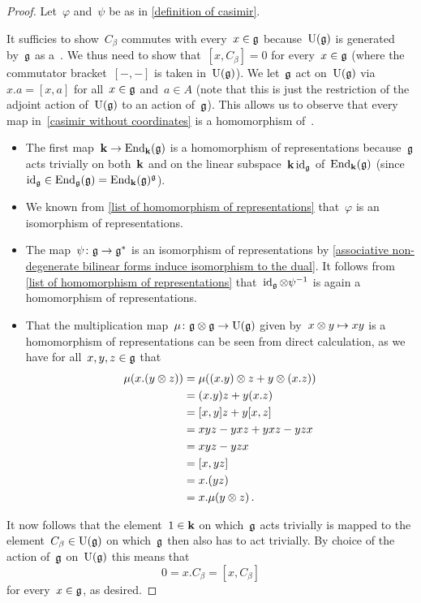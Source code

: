 \begin{proof}
  Let~$\varphi$ and~$\psi$ be as in \cref{definition of casimir}.
  
  It sufficies to show~$C_\beta$ commutes with every~$x \in \mathfrak{g}$ because~$\operatorname{U}(\mathfrak{g})$ is generated by~$\glie$ as a~\algebra{$\kf$}.
  We thus need to show that~$[x, C_\beta] = 0$ for every~$x \in \mathfrak{g}$ (where the commutator bracket~$[-,-]$ is taken in~$\operatorname{U}(\mathfrak{g})$).
  We let~$\glie$ act on~$\operatorname{U}(\mathfrak{g})$ via~$x.a = [x,a]$ for all~$x \in \mathfrak{g}$ and~$a \in A$ (note that this is just the restriction of the adjoint action of~$\operatorname{U}(\mathfrak{g})$ to an action of~$\glie$).
  This allows us to observe that every map in~\eqref{casimir without coordinates} is a homomorphism of~{\representations{$\glie$}}.
  \begin{itemize}
    \item
      The first map~$\mathbf{k} \to \operatorname{End}_{\mathbf{k}}(\mathfrak{g})$ is a homomorphism of representations because~$\glie$ acts trivially on both~$\kf$ and on the {\onedimensional} linear subspace~$\mathbf{k} \operatorname{id}_{\mathfrak{g}}$ of~$\operatorname{End}_{\mathbf{k}}(\mathfrak{g})$ (since~$\operatorname{id}_{\mathfrak{g}} \in \operatorname{End}_{\mathfrak{g}}(\mathfrak{g}) = \operatorname{End}_{\mathbf{k}}(\mathfrak{g})^{\mathfrak{g}}$).
    \item
      We known from \cref{list of homomorphism of representations} that~$\varphi$ is an isomorphism of representations.
    \item
      The map~$\psi \colon \mathfrak{g} \to \mathfrak{g}^*$ is an isomorphism of representations by \cref{associative non-degenerate bilinear forms induce isomorphism to the dual}.
      It follows from \cref{list of homomorphism of representations} that~$\operatorname{id}_{\mathfrak{g}} \otimes \psi^{-1}$ is again a homomorphism of representations.
    \item
      That the multiplication map~$\mu \colon \mathfrak{g} \otimes \mathfrak{g} \to \operatorname{U}(\mathfrak{g})$ given by~$x \otimes y \mapsto xy$ is a homomorphism of representations can be seen from direct calculation, as we have for all~$x, y, z \in \mathfrak{g}$ that
      \begin{align*}
        \mu(x.(y \otimes z))
        &=
        \mu((x.y) \otimes z + y \otimes (x.z))
        \\
        &=
        (x.y)z + y(x.z)
        \\
        &=
        [x,y]z + y[x,z]
        \\
        &=
        xyz - yxz + yxz - yzx
        \\
        &=
        xyz - yzx
        \\
        &= [x,yz]
        \\
        &= x.(yz)
        \\
        &= x.\mu(y \otimes z) \,.
      \end{align*}
  \end{itemize}
  
  It now follows that the element~$1 \in \mathbf{k}$ on which~$\glie$ acts trivially is mapped to the element~$C_\beta \in \operatorname{U}(\mathfrak{g})$ on which~$\glie$ then also has to act trivially.
  By choice of the action of~$\glie$ on~$\operatorname{U}(\mathfrak{g})$ this means that
  \[
    0
    =
    x.C_\beta
    =
    [x, C_\beta]
  \]
  for every~$x \in \mathfrak{g}$, as desired.
\end{proof}


